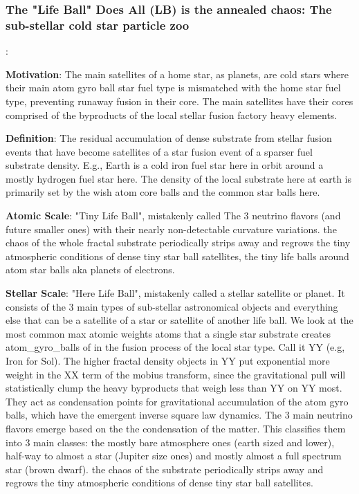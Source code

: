 \documentclass[11pt,a4paper]{article}
\begin{document}

    \subsubsection{The "Life Ball" Does All (LB) is the annealed chaos:
     The sub-stellar cold star particle zoo
     }: 

    \noindent\textbf{Motivation}:
     The main satellites of a home star, as planets, are cold stars where their main atom gyro ball star fuel type is mismatched with the home star fuel type, preventing runaway fusion in their core. The main satellites have their cores comprised of the byproducts of the local stellar fusion factory heavy elements. 

    \noindent\textbf{Definition}: The residual accumulation of dense substrate from stellar fusion events that have become satellites of a star fusion event of a sparser fuel substrate density. E.g., Earth is a cold iron fuel star here in orbit around a mostly hydrogen fuel star here. The density of the local substrate here at earth is primarily set by the wish atom core balls and the common star balls here. 

    \noindent\textbf{Atomic Scale}: "Tiny Life Ball", mistakenly called The 3 neutrino flavors (and future smaller ones) with their nearly non-detectable curvature variations. the chaos of the whole fractal  substrate periodically strips away and regrows the tiny atmospheric conditions of dense tiny star ball satellites, the tiny life balls around atom star balls aka planets of electrons. 

    \noindent\textbf{Stellar Scale}: "Here Life Ball", mistakenly called a stellar satellite or planet. It consists of the 3 main types of sub-stellar astronomical objects and everything else that can be a satellite of a star or satellite of another life ball. We look at the most common max atomic weights atoms that a single star substrate creates atom\_gyro\_balls of in the fusion process of the local star type. Call it YY (e.g, Iron for Sol). The higher fractal density objects in YY put exponential more weight in the XX term of the mobius transform, since the gravitational pull will statistically clump the heavy byproducts that weigh less than YY on YY most. They act as condensation points for gravitational accumulation of the atom gyro balls, which have the emergent inverse square law dynamics. The 3 main neutrino flavors emerge based on the the condensation of the matter. This classifies them into 3 main classes: the mostly bare atmosphere ones (earth sized and lower), half-way to almost a star (Jupiter size ones) and mostly almost a full spectrum star (brown dwarf). the chaos of the substrate periodically strips away and regrows the tiny atmospheric conditions of dense tiny star ball satellites.
\end{document}
